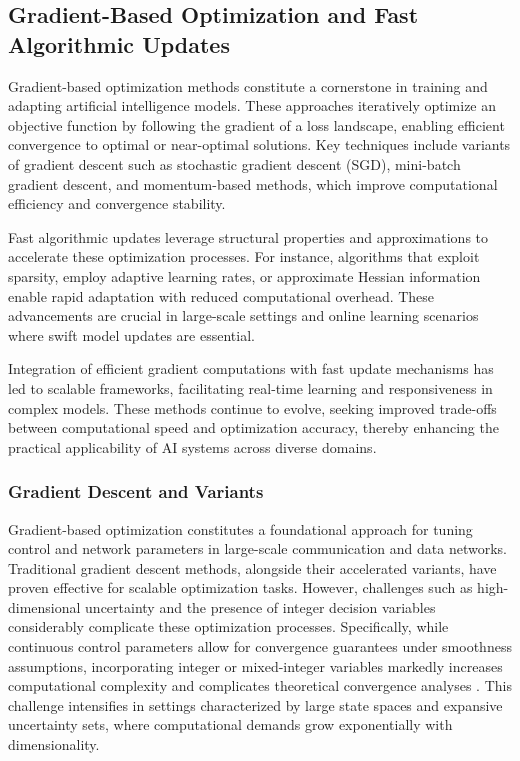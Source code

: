 \documentclass[sigconf]{acmart}
\begin{document}
\subsection{Gradient-Based Optimization and Fast Algorithmic Updates}
Gradient-based optimization methods constitute a cornerstone in training and adapting artificial intelligence models. These approaches iteratively optimize an objective function by following the gradient of a loss landscape, enabling efficient convergence to optimal or near-optimal solutions. Key techniques include variants of gradient descent such as stochastic gradient descent (SGD), mini-batch gradient descent, and momentum-based methods, which improve computational efficiency and convergence stability.

Fast algorithmic updates leverage structural properties and approximations to accelerate these optimization processes. For instance, algorithms that exploit sparsity, employ adaptive learning rates, or approximate Hessian information enable rapid adaptation with reduced computational overhead. These advancements are crucial in large-scale settings and online learning scenarios where swift model updates are essential.

Integration of efficient gradient computations with fast update mechanisms has led to scalable frameworks, facilitating real-time learning and responsiveness in complex models. These methods continue to evolve, seeking improved trade-offs between computational speed and optimization accuracy, thereby enhancing the practical applicability of AI systems across diverse domains.

\subsubsection{Gradient Descent and Variants}

Gradient-based optimization constitutes a foundational approach for tuning control and network parameters in large-scale communication and data networks. Traditional gradient descent methods, alongside their accelerated variants, have proven effective for scalable optimization tasks. However, challenges such as high-dimensional uncertainty and the presence of integer decision variables considerably complicate these optimization processes. Specifically, while continuous control parameters allow for convergence guarantees under smoothness assumptions, incorporating integer or mixed-integer variables markedly increases computational complexity and complicates theoretical convergence analyses \cite{ref36}. This challenge intensifies in settings characterized by large state spaces and expansive uncertainty sets, where computational demands grow exponentially with dimensionality.
\end{document}
